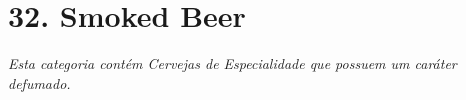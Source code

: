 \section*{32. Smoked Beer}

\textit{Esta categoria contém Cervejas de Especialidade que possuem um caráter defumado.}
